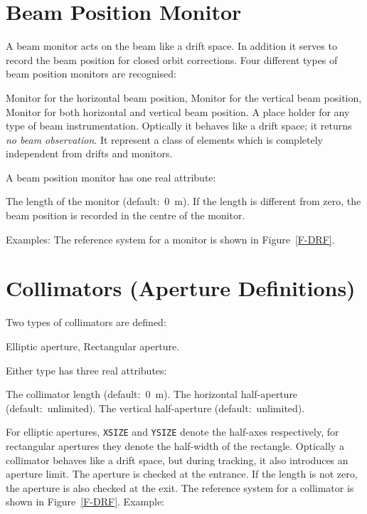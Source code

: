 \section{Beam Position Monitor}
\label{S-MONI}
A beam monitor acts on the beam like a drift space.
In addition it serves to record the beam position for closed orbit
corrections.
Four different types of beam position monitors are recognised:
\begin{mylist}
Monitor for the horizontal beam position,
Monitor for the vertical beam position,
Monitor for both horizontal and vertical beam position.
A place holder for any type of beam instrumentation.
Optically it behaves like a drift space;
it returns {\em no beam observation}.
It represent a class of elements
which is completely independent from drifts and monitors.
\end{mylist}
A beam position monitor has one real attribute:
\begin{mylist}
The length of the monitor (default:~0~m). If the length is
different from zero,
the beam position is recorded in the centre of the monitor.
\end{mylist}
Examples:
The reference system for a monitor is shown in Figure~\ref{F-DRF}.
 
\section{Collimators (Aperture Definitions)}
\label{S-COLL}
Two types of collimators are defined:
\begin{mylist}
Elliptic aperture,
Rectangular aperture.
\end{mylist}
Either type has three real attributes:
\begin{mylist}
The collimator length (default:~0~m).
The horizontal half-aperture (default:~unlimited).
The vertical half-aperture (default:~unlimited).
\end{mylist}
For elliptic apertures,
{\tt XSIZE} and {\tt YSIZE} denote the half-axes respectively,
for rectangular apertures they denote the half-width of the rectangle.
Optically a collimator behaves like a drift space, but during tracking,
it also introduces an aperture limit.
The aperture is checked at the entrance.
If the length is not zero, the aperture is also checked at the exit.
The reference system for a collimator is shown in
Figure~\ref{F-DRF}.
Example:
 
